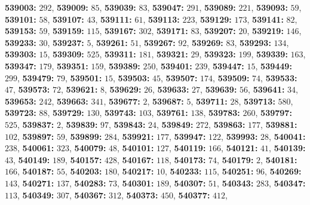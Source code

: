 \textsf{\bfseries 539003:} $292$, \textsf{\bfseries 539009:} $85$, \textsf{\bfseries 539039:} $83$, \textsf{\bfseries 539047:} $291$, \textsf{\bfseries 539089:} $221$, \textsf{\bfseries 539093:} $59$, \textsf{\bfseries 539101:} $58$, \textsf{\bfseries 539107:} $43$, \textsf{\bfseries 539111:} $61$, \textsf{\bfseries 539113:} $223$, \textsf{\bfseries 539129:} $173$, \textsf{\bfseries 539141:} $82$, \textsf{\bfseries 539153:} $59$, \textsf{\bfseries 539159:} $115$, \textsf{\bfseries 539167:} $302$, \textsf{\bfseries 539171:} $83$, \textsf{\bfseries 539207:} $20$, \textsf{\bfseries 539219:} $146$, \textsf{\bfseries 539233:} $30$, \textsf{\bfseries 539237:} $5$, \textsf{\bfseries 539261:} $51$, \textsf{\bfseries 539267:} $92$, \textsf{\bfseries 539269:} $83$, \textsf{\bfseries 539293:} $134$, \textsf{\bfseries 539303:} $15$, \textsf{\bfseries 539309:} $525$, \textsf{\bfseries 539311:} $181$, \textsf{\bfseries 539321:} $29$, \textsf{\bfseries 539323:} $199$, \textsf{\bfseries 539339:} $163$, \textsf{\bfseries 539347:} $179$, \textsf{\bfseries 539351:} $159$, \textsf{\bfseries 539389:} $250$, \textsf{\bfseries 539401:} $239$, \textsf{\bfseries 539447:} $15$, \textsf{\bfseries 539449:} $299$, \textsf{\bfseries 539479:} $79$, \textsf{\bfseries 539501:} $15$, \textsf{\bfseries 539503:} $45$, \textsf{\bfseries 539507:} $174$, \textsf{\bfseries 539509:} $74$, \textsf{\bfseries 539533:} $47$, \textsf{\bfseries 539573:} $72$, \textsf{\bfseries 539621:} $8$, \textsf{\bfseries 539629:} $26$, \textsf{\bfseries 539633:} $27$, \textsf{\bfseries 539639:} $56$, \textsf{\bfseries 539641:} $34$, \textsf{\bfseries 539653:} $242$, \textsf{\bfseries 539663:} $341$, \textsf{\bfseries 539677:} $2$, \textsf{\bfseries 539687:} $5$, \textsf{\bfseries 539711:} $28$, \textsf{\bfseries 539713:} $580$, \textsf{\bfseries 539723:} $88$, \textsf{\bfseries 539729:} $130$, \textsf{\bfseries 539743:} $103$, \textsf{\bfseries 539761:} $138$, \textsf{\bfseries 539783:} $260$, \textsf{\bfseries 539797:} $525$, \textsf{\bfseries 539837:} $2$, \textsf{\bfseries 539839:} $97$, \textsf{\bfseries 539843:} $24$, \textsf{\bfseries 539849:} $272$, \textsf{\bfseries 539863:} $177$, \textsf{\bfseries 539881:} $102$, \textsf{\bfseries 539897:} $59$, \textsf{\bfseries 539899:} $284$, \textsf{\bfseries 539921:} $177$, \textsf{\bfseries 539947:} $122$, \textsf{\bfseries 539993:} $28$, \textsf{\bfseries 540041:} $238$, \textsf{\bfseries 540061:} $323$, \textsf{\bfseries 540079:} $48$, \textsf{\bfseries 540101:} $127$, \textsf{\bfseries 540119:} $166$, \textsf{\bfseries 540121:} $41$, \textsf{\bfseries 540139:} $43$, \textsf{\bfseries 540149:} $189$, \textsf{\bfseries 540157:} $428$, \textsf{\bfseries 540167:} $118$, \textsf{\bfseries 540173:} $74$, \textsf{\bfseries 540179:} $2$, \textsf{\bfseries 540181:} $166$, \textsf{\bfseries 540187:} $55$, \textsf{\bfseries 540203:} $180$, \textsf{\bfseries 540217:} $10$, \textsf{\bfseries 540233:} $115$, \textsf{\bfseries 540251:} $96$, \textsf{\bfseries 540269:} $143$, \textsf{\bfseries 540271:} $137$, \textsf{\bfseries 540283:} $73$, \textsf{\bfseries 540301:} $189$, \textsf{\bfseries 540307:} $51$, \textsf{\bfseries 540343:} $283$, \textsf{\bfseries 540347:} $113$, \textsf{\bfseries 540349:} $307$, \textsf{\bfseries 540367:} $312$, \textsf{\bfseries 540373:} $450$, \textsf{\bfseries 540377:} $412$, 

